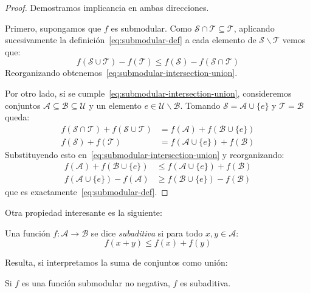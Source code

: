   \begin{proof}
    Demostramos implicancia en ambas direcciones.

    Primero,
    supongamos que \(f\) es submodular.
    Como \(\mathscr{S} \cap \mathscr{T} \subseteq \mathscr{T}\),
    aplicando sucesivamente la definición~\eqref{eq:submodular-def}
    a cada elemento de \(\mathscr{S} \smallsetminus \mathscr{T}\)
    vemos que:
    \begin{equation*}
      f(\mathscr{S} \cup \mathscr{T}) - f(\mathscr{T})
        \le f(\mathscr{S}) - f(\mathscr{S} \cap \mathscr{T})
    \end{equation*}
    Reorganizando obtenemos~\eqref{eq:submodular-intersection-union}.

    Por otro lado,
    si se cumple~\eqref{eq:submodular-intersection-union},
    consideremos conjuntos
      \(\mathscr{A} \subseteq \mathscr{B} \subseteq \mathscr{U}\)
    y un elemento \(e \in \mathscr{U} \smallsetminus \mathscr{B}\).
    Tomando \(\mathscr{S} = \mathscr{A} \cup \{e\}\)
    y \(\mathscr{T} = \mathscr{B}\)
    queda:
    \begin{align*}
      f(\mathscr{S} \cap \mathscr{T}) + f(\mathscr{S} \cup \mathscr{T})
        &= f(\mathscr{A}) + f(\mathscr{B} \cup \{e\}) \\
      f(\mathscr{S}) + f(\mathscr{T})
        &= f(\mathscr{A} \cup \{e\}) + f(\mathscr{B})
    \end{align*}
    Substituyendo esto en~\eqref{eq:submodular-intersection-union}
    y reorganizando:
    \begin{align*}
      f(\mathscr{A}) + f(\mathscr{B} \cup \{e\})
        &\le f(\mathscr{A} \cup \{e\}) + f(\mathscr{B}) \\
      f(\mathscr{A} \cup \{e\}) - f(\mathscr{A})
        &\ge f(\mathscr{B} \cup \{e\}) - f(\mathscr{B})
    \end{align*}
    que es exactamente~\eqref{eq:submodular-def}.
  \end{proof}
  Otra propiedad interesante es la siguiente:
  \begin{definition}
    \label{def:subaditive}
    Una función \(f \colon \mathscr{A} \to \mathscr{B}\)
    se dice \emph{subaditiva} si para todo \(x, y \in \mathscr{A}\):
    \begin{equation*}
      f(x + y)
        \le f(x) + f(y)
    \end{equation*}
  \end{definition}
  Resulta,
  si interpretamos la suma de conjuntos como unión:
  \begin{corollary}
    \label{cor:submodular-subadditive}
    Si \(f\) es una función submodular no negativa,
    \(f\) es subaditiva.
  \end{corollary}
